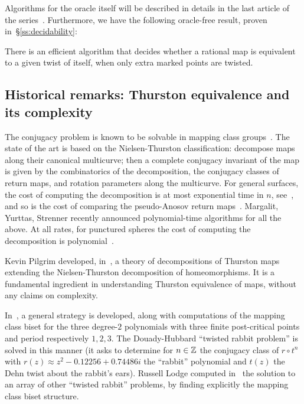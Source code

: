 \documentclass{amsart}
\begin{document}
Algorithms for the oracle itself will be described in details in the last article
of the series~\cite{bartholdi-dudko:bc5}. Furthermore, we have the
following oracle-free result, proven in~\S\ref{ss:decidability}:
\begin{maincor}\label{cor:G}
  There is an efficient algorithm that decides whether a rational map
  is equivalent to a given twist of itself, when only extra marked
  points are twisted.
\end{maincor}

\subsection{Historical remarks: Thurston equivalence and its complexity}
The conjugacy problem is known to be solvable in mapping class
groups~\cite{hemion:homeos}. The state of the art is based on the
Nielsen-Thurston classification: decompose maps along their canonical
multicurve; then a complete conjugacy invariant of the map is given by
the combinatorics of the decomposition, the conjugacy classes of
return maps, and rotation parameters along the multicurve. For general
surfaces, the cost of computing the decomposition is at most
exponential time in $n$,
see~\cites{koberda-mangahas:detectNT,tao:linearbound}, and so is the
cost of comparing the pseudo-Anosov return
maps~\cite{masur-minsky:gcc2}. Margalit, Yurttas, Strenner recently
announced polynomial-time algorithms for all the above. At all rates,
for punctured spheres the cost of computing the decomposition is
polynomial~\cite{calvez:NT}.

Kevin Pilgrim developed, in~\cite{pilgrim:combinations}, a theory of
decompositions of Thurston maps extending the Nielsen-Thurston
decomposition of homeomorphisms. It is a fundamental ingredient in
understanding Thurston equivalence of maps, without any claims on
complexity.

In~\cite{bartholdi-n:thurston}, a general strategy is developed, along
with computations of the mapping class biset for the three degree-$2$
polynomials with three finite post-critical points and period
respectively $1,2,3$. The Douady-Hubbard ``twisted rabbit problem'' is
solved in this manner (it asks to determine for $n\in{\mathbb Z}$ the conjugacy
class of $r\circ t^n$ with $r(z)\approx z^2-0.12256+0.74486i$ the
``rabbit'' polynomial and $t(z)$ the Dehn twist about the rabbit's
ears). Russell Lodge computed in~\cite{lodge:pullback} the solution to
an array of other ``twisted rabbit'' problems, by finding explicitly
the mapping class biset structure.
\end{document}
